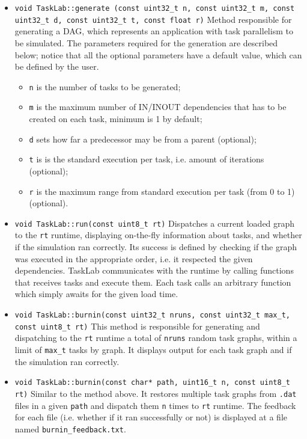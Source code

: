 \begin{itemize}
\item \texttt{\noindent void TaskLab::generate \newline
(const uint32\_t n, const uint32\_t m, const uint32\_t d, \newline
 const uint32\_t t, const float r)} \newline
Method responsible for generating a DAG, which represents an application with task parallelism to be simulated. The parameters required for the generation are described below; notice that all the optional parameters have a default value, which can be defined by the user.
\begin{itemize}
\item \texttt{n} is the number of tasks to be generated; 
\item \texttt{m} is the maximum number of IN/INOUT dependencies that has to be created on each task, minimum is 1 by default; 
\item \texttt{d} sets how far a predecessor may be from a parent (optional); 
\item \texttt{t} is is the standard execution per task, i.e. amount of iterations (optional); 
\item \texttt{r} is the maximum range from standard execution per task (from 0 to 1) (optional). 
\end{itemize}

\item \texttt{void TaskLab::run(const uint8\_t rt)} \newline
Dispatches a current loaded graph to the \texttt{rt} runtime, displaying on-the-fly information about tasks, and whether if the simulation ran correctly. Its success is defined by checking if the graph was executed in the appropriate order, i.e. it respected the given dependencies. TaskLab communicates with the runtime by calling functions that receives tasks and execute them. Each task calls an arbitrary function which simply awaits for the given load time.

\item \texttt{void TaskLab::burnin(const uint32\_t nruns, const uint32\_t max\_t, const uint8\_t rt)} \newline
This method is responsible for generating and dispatching to the \texttt{rt} runtime a total of \texttt{nruns} random task graphs, within a limit of \texttt{max\_t} tasks by graph. It displays output for each task graph and if the simulation ran correctly.

\item \texttt{void TaskLab::burnin(const char* path, uint16\_t n, const uint8\_t rt)} \newline
Similar to the method above. It restores multiple task graphs from \texttt{.dat} files in a given \texttt{path} and dispatch them \texttt{n} times to \texttt{rt} runtime. The feedback for each file (i.e. whether if it ran successfully or not) is displayed at a file named \texttt{burnin\_feedback.txt}.


\end{itemize}
